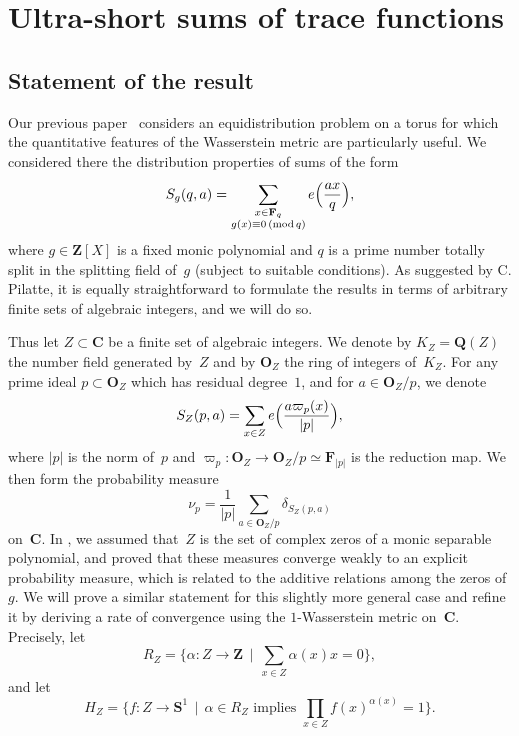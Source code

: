 \documentclass[12pt]{amsart}
\newcommand{\Cc}{\mathbf{C}}
\newcommand{\Oo}{\mathbf{O}}
\newcommand{\Zz}{\mathbf{Z}}
\newcommand{\Ss}{\mathbf{S}}
\newcommand{\Qq}{\mathbf{Q}}
\newcommand{\Ff}{\mathbf{F}}
\newcommand{\mods}[1]{\,(\mathrm{mod}\,{#1})}
\theoremstyle{plain}
\theoremstyle{remark}
\theoremstyle{definition}
\begin{document}
\section{Ultra-short sums of trace functions}\label{sec-ultra-short}

\subsection{Statement of the result}

Our previous paper~\cite{ultrashort} considers an equidistribution
problem on a torus for which the quantitative features of the
Wasserstein metric are particularly useful.  We considered there the
distribution properties of sums of the form
\begin{equation}\label{eq-sums}
  S_g(q,a) = \sum_{\substack{x \in \Ff_q \\ g(x) \equiv 0 \mods{q}}}^{}
  e\Bigl(\frac{ax}{q}\Bigr),
\end{equation}
where $g \in \Zz[X]$ is a fixed monic polynomial and $q$ is a prime
number totally split in the splitting field of~$g$ (subject to suitable
conditions). As suggested by C. Pilatte, it is equally straightforward
to formulate the results in terms of arbitrary finite sets of algebraic
integers, and we will do so.

Thus let $Z\subset \Cc$ be a finite set of algebraic integers. We denote
by $K_Z=\Qq(Z)$ the number field generated by~$Z$ and by $\Oo_Z$ the
ring of integers of~$K_Z$. For any prime ideal $p\subset \Oo_Z$ which
has residual degree~$1$, and for $a\in\Oo_Z/p$, we denote
\[
  S_Z(p,a) = \sum_{x\in Z} e\Bigl(\frac{a\varpi_p(x)}{|p|}\Bigr),
\]
where $|p|$ is the norm of~$p$ and
$\varpi_p\colon \Oo_Z\to \Oo_Z/p\simeq \Ff_{|p|}$ is the reduction
map. We then form the probability measure
\[
  \nu_p = \frac{1}{|p|} \sum_{a \in \Oo_Z /p} \delta_{S_Z(p,a)}
\]
on~$\Cc$.  In \cite[Th.\,1.1]{ultrashort}, we assumed that~$Z$ is the
set of complex zeros of a monic separable polynomial, and proved that
these measures converge weakly to an explicit probability measure,
which is related to the additive
relations among the zeros of $g$. We will prove a similar statement for
this slightly more general case and refine it by deriving a rate of
convergence using the $1$-Wasserstein metric on~$\Cc$. Precisely, let
\[
  R_Z=\{\alpha\colon Z\to\Zz\,\mid\, \sum_{x\in Z}\alpha(x)x=0\},
\]
and let
\begin{equation}\label{eq-hz}
  H_Z=\{f\colon Z\to\Ss^1\,\mid\, \alpha\in R_Z\text{ implies }
  \prod_{x\in Z}f(x)^{\alpha(x)}=1\}.
\end{equation}
\end{document}
